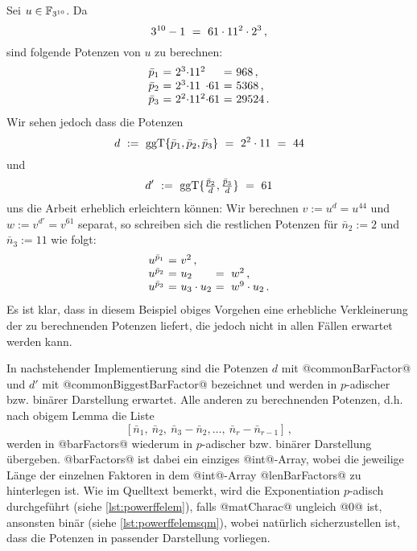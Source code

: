 \begin{beispiel}
  Sei $u \in \mathbb{F}_{3^{10}}$. Da
  \[ 3^{10}-1 \ =\  61 \cdot 11^{2} \cdot 2^{3} \,,\]
  sind folgende Potenzen von $u$ zu berechnen:
  \[ \begin{array}{l@{\ =\ }l@{}l@{}l@{\ =\ }l}
    \bar p_1 & 2^3 \cdot & 11^2 && 968\,, \\
    \bar p_2 & 2^3 \cdot & 11 & \cdot 61 & 5368\,,\\
    \bar p_3 & 2^2 \cdot & 11^2 & \cdot 61 & 29524\,.
    \end{array}\]
  Wir sehen jedoch dass die Potenzen
  \[ d \ :=\  \operatorname{ggT}\{ \bar p_1,\bar p_2,\bar p_3\} 
    \ =\  2^2\cdot 11 \ =\  44 \]
  und 
  \[ d' \ :=\  \operatorname{ggT}\{ \tfrac{\bar p_2}{d},\tfrac{\bar p_3}{d}\} \ =\  61\]
  uns die Arbeit erheblich erleichtern können:
  Wir berechnen $v := u^d = u^{44}$ und 
  $w := v^{d'} = v^{61}$ separat, so schreiben sich die restlichen Potenzen 
  für $\bar n_2 := 2$ und $\bar n_3 := 11$ wie folgt:
  \[ \begin{array}{l@{\ =\ }l@{}l}
    u^{\bar p_1} & v^2\,, \\
    u^{\bar p_2} & u_2 &\speq= w^2\,, \\
    u^{\bar p_3} & u_3\cdot u_2 &\speq= w^9 \cdot u_2 \,.
  \end{array} \]
  Es ist klar, dass in diesem Beispiel obiges Vorgehen eine erhebliche
  Verkleinerung der zu berechnenden Potenzen liefert, die jedoch nicht in allen
  Fällen erwartet werden kann.
\end{beispiel}


In nachstehender Implementierung sind die Potenzen $d$
mit @commonBarFactor@ und $d'$ mit @commonBiggestBarFactor@ bezeichnet und
werden in $p$-adischer bzw. binärer Darstellung erwartet.  
Alle anderen zu berechnenden Potenzen, d.h. nach obigem Lemma die Liste
\[ [\bar n_1,\ \bar n_2,\ \bar n_3-\bar n_2,\ldots,\ 
  \bar n_r - \bar n_{r-1}]\,, \]
werden in 
@barFactors@ wiederum in $p$-adischer bzw. binärer Darstellung übergeben.
@barFactors@ ist dabei ein einziges @int@-Array,
wobei die jeweilige Länge der einzelnen Faktoren in dem @int@-Array
@lenBarFactors@ zu hinterlegen ist. Wie im Quelltext bemerkt, wird 
die Exponentiation $p$-adisch durchgeführt (siehe \autoref{lst:powerffelem}),
falls @matCharac@ ungleich @0@ ist, ansonsten binär 
(siehe \autoref{lst:powerffelemsqm}), wobei natürlich sicherzustellen ist, dass
die Potenzen in passender Darstellung vorliegen.

